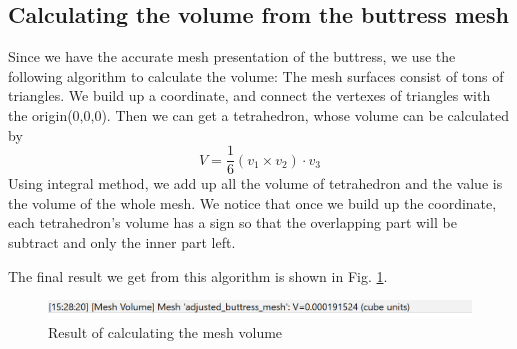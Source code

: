 \documentclass[runningheads,a4paper]{llncs}
\begin{document}
\subsection{Calculating the volume from the buttress mesh}
Since we have the accurate mesh presentation of the buttress, we use the following algorithm to calculate the volume:
The mesh surfaces consist of tons of triangles. We build up a coordinate, and connect the vertexes of triangles with the origin(0,0,0). Then we can get a tetrahedron, whose volume can be calculated by
\begin{equation}
V = \frac{1}{6}(v_1 \times v_2) \cdot v_3
\end{equation}
Using integral method, we add up all the volume of tetrahedron and the value is the volume of the whole mesh. We notice that once we build up the coordinate, each tetrahedron’s  volume has a sign so that the overlapping part will be subtract and only the inner part left. 

The final result we get from this algorithm is shown in Fig. \ref{fig:mesh-volume}.

\begin{figure}
\centering
\includegraphics[scale=0.8]{finalresults.PNG}
\caption{Result of calculating the mesh volume}
\label{fig:mesh-volume}
\end{figure}
\end{document}
